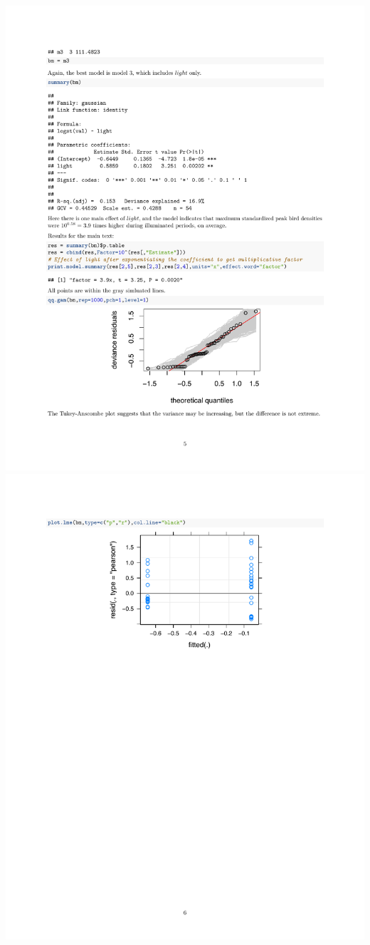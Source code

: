 \documentclass[a4paper, twoside]{templates/ociamthesis}
\begin{document}
\includegraphics[width=1\linewidth]{pdf_chapters/lights/lights_supp_crop_Part39}
\includegraphics[width=1\linewidth]{pdf_chapters/lights/lights_supp_crop_Part40}
\end{document}
